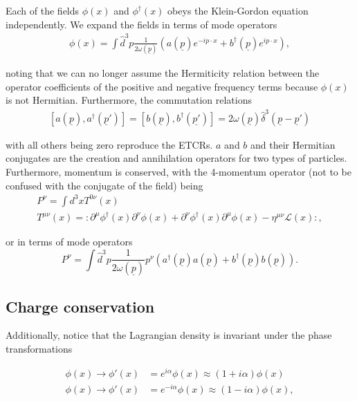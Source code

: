 \documentclass{article}
\numberwithin{equation}{section}
\newcommand{\normord}[1]{:\mathrel{#1}:}
\begin{document}
Each of the fields $\phi(x)$ and $\phi^\dagger(x)$ obeys the Klein-Gordon equation independently. We expand the fields in terms of mode operators
\begin{equation}
\begin{aligned}
    \phi(x) = \int \hat{d}^3p \frac{1}{2\omega(\underline{p})} \left(a(\underline{p})e^{-ip\cdot x} + b^\dagger(\underline{p})e^{ip\cdot x}\right),
\end{aligned}
\end{equation}

noting that we can no longer assume the Hermiticity relation between the operator coefficients of the positive and negative frequency terms because $\phi(x)$ is not Hermitian. Furthermore, the commutation relations 
\begin{equation}
\begin{aligned}
    [a(\underline{p}), a^\dagger(\underline{p}')] = [b(\underline{p}), b^\dagger(\underline{p'})] = 2\omega(\underline{p}) \hat{\delta}^3(\underline{p}-\underline{p}')
\end{aligned}
\end{equation}

with all others being zero reproduce the ETCRs. $a$ and $b$ and their Hermitian conjugates are the creation and annihilation operators for two types of particles. Furthermore, momentum is conserved, with the 4-momentum operator (not to be confused with the conjugate of the field) being 
\begin{gather}
    P^\nu = \int d^3x T^{0\nu}(x)\\
    T^{\mu\nu}(x) = \normord{\partial^\mu \phi^\dagger(x) \partial^\nu \phi(x) + \partial^\nu \phi^\dagger(x) \partial^\mu \phi(x) - \eta^{\mu\nu} \mathcal{L}(x)},
\end{gather}

or in terms of mode operators
\begin{equation}
    P^\nu = \int \hat{d}^3p \frac{1}{2\omega(\underline{p})}p^\nu \left(a^\dagger(\underline{p}) a(\underline{p}) + b^\dagger(\underline{p})b(\underline{p})\right).
\end{equation}

\subsection{Charge conservation}

Additionally, notice that the Lagrangian density is invariant under the phase transformations

\begin{equation}
\begin{aligned}
    \phi(x) \rightarrow \phi'(x)&=e^{i\alpha}\phi(x) \approx (1+i\alpha)\phi(x) \\
    \phi(x) \rightarrow \phi'(x)&=e^{-i\alpha}\phi(x) \approx (1-i\alpha)\phi(x),
\end{aligned}
\end{equation}
\end{document}
